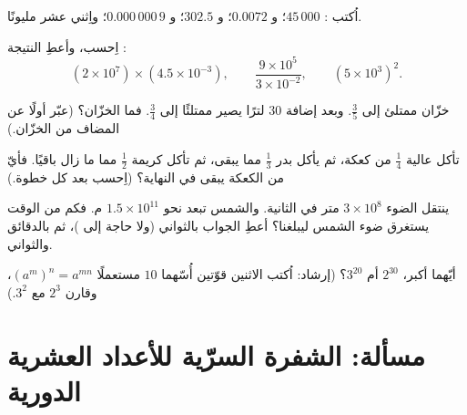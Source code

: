 \begin{exercise}[$\star$]\label{exo:g9:fractions:5}
اُكتب : $45\,000$؛ و $0.0072$؛ و $302.5$؛
و $0.000\,000\,9$؛ واِثني عشر مليونًا.
\end{exercise}

\begin{exercise}[$\star\star$]\label{exo:g9:fractions:6}
اِحسب، وأعطِ النتيجة :
\[
(2 \times 10^7) \times (4.5 \times 10^{-3}),
\qquad
\frac{9 \times 10^5}{3 \times 10^{-2}},
\qquad
(5 \times 10^3)^2 .
\]
\end{exercise}

\begin{exercise}[$\star\star$]\label{exo:g9:fractions:7}
خزّان ممتلئ إلى $\frac35$. وبعد إضافة $30$ لترًا يصير ممتلئًا إلى $\frac34$.
فما  الخزّان؟ (عبّر أولًا عن  المضاف من
الخزّان.)
\end{exercise}

\begin{exercise}[$\star\star$]\label{exo:g9:fractions:8}
تأكل عالية $\frac14$ من كعكة، ثم يأكل بدر $\frac13$ مما يبقى،
ثم تأكل كريمة $\frac12$ مما ما زال باقيًا. فأيّ  من
الكعكة يبقى في النهاية؟ (اِحسب  بعد كل خطوة.)
\end{exercise}

\begin{exercise}[$\star\star$]\label{exo:g9:fractions:9}
ينتقل الضوء $3 \times 10^8$ متر في الثانية. والشمس تبعد نحو
$1.5 \times 10^{11}$ م. فكم من الوقت يستغرق ضوء الشمس ليبلغنا؟
أعطِ الجواب بالثواني (ولا حاجة إلى )، ثم بالدقائق
والثواني.
\end{exercise}

\begin{exercise}[$\star\star\star$]\label{exo:g9:fractions:10}
أيّهما أكبر، $2^{30}$ أم $3^{20}$؟ (إرشاد: اُكتب الاثنين قوّتين
أُسّهما $10$ مستعملًا $\left(a^m\right)^n = a^{mn}$، وقارن $2^3$ مع
$3^2$.)
\end{exercise}

\section{مسألة: الشفرة السرّية للأعداد العشرية الدورية}

